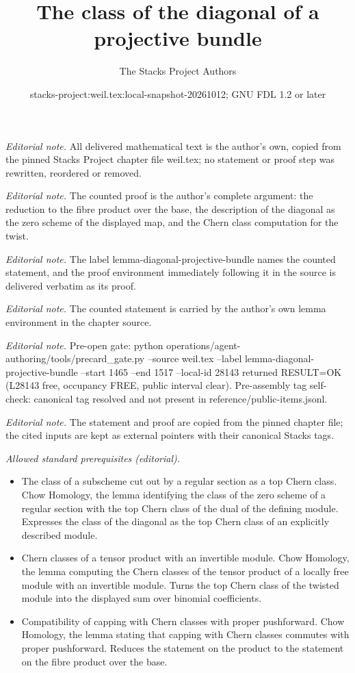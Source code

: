 \documentclass[10pt,a4paper]{amsart}
\title{The class of the diagonal of a projective bundle}
\author{The Stacks Project Authors}
\date{stacks-project:weil.tex:local-snapshot-20261012; GNU FDL 1.2 or later}
\theoremstyle{plain}
\theoremstyle{definition}
\theoremstyle{remark}
\numberwithin{equation}{subsection}
\begin{document}
\maketitle
\noindent\textit{Editorial note.} All delivered mathematical text is the author's own, copied from the pinned Stacks Project chapter file weil.tex; no statement or proof step was rewritten, reordered or removed.\par\medskip
\noindent\textit{Editorial note.} The counted proof is the author's complete argument: the reduction to the fibre product over the base, the description of the diagonal as the zero scheme of the displayed map, and the Chern class computation for the twist.\par\medskip
\noindent\textit{Editorial note.} The label lemma-diagonal-projective-bundle names the counted statement, and the proof environment immediately following it in the source is delivered verbatim as its proof.\par\medskip
\noindent\textit{Editorial note.} The counted statement is carried by the author's own lemma environment in the chapter source.\par\medskip
\noindent\textit{Editorial note.} Pre-open gate: python operations/agent-authoring/tools/precard\_gate.py --source weil.tex --label lemma-diagonal-projective-bundle --start 1465 --end 1517 --local-id 28143 returned RESULT=OK (L28143 free, occupancy FREE, public interval clear). Pre-assembly tag self-check: canonical tag resolved and not present in reference/public-items.jsonl.\par\medskip
\noindent\textit{Editorial note.} The statement and proof are copied from the pinned chapter file; the cited inputs are kept as external pointers with their canonical Stacks tags.\par\medskip
\noindent\textit{Allowed standard prerequisites (editorial).}\begin{itemize}
\item The class of a subscheme cut out by a regular section as a top Chern class. Chow Homology, the lemma identifying the class of the zero scheme of a regular section with the top Chern class of the dual of the defining module. Expresses the class of the diagonal as the top Chern class of an explicitly described module.
\item Chern classes of a tensor product with an invertible module. Chow Homology, the lemma computing the Chern classes of the tensor product of a locally free module with an invertible module. Turns the top Chern class of the twisted module into the displayed sum over binomial coefficients.
\item Compatibility of capping with Chern classes with proper pushforward. Chow Homology, the lemma stating that capping with Chern classes commutes with proper pushforward. Reduces the statement on the product to the statement on the fibre product over the base.
\end{itemize}\medskip
\end{document}
